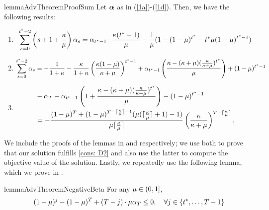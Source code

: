     \begin{restatable}{lemma}{AdvTheoremProofSum}
    \label{lemma: AdvTheoremProofSum}
        Let $\bm{\alpha}$ as in (\ref{1a})-(\ref{1d}). Then, we have the following results:
        \begin{enumerate}
            \item \begin{equation*}
            \sum_{s=0}^{t^*-2} \left(s+1+\frac{\kappa}{\mu} \right) \alpha_s= \alpha_{t^*-1} \cdot \frac{\kappa(t^*-1)}{\mu} - \frac{1}{\mu} (1 - (1-\mu)^{t^*} - t^* \mu (1-\mu)^{t^*-1})
        \end{equation*}
        \item \begin{equation*}
            \sum_{s=0}^{t^*-2} \alpha_s = -\frac{1}{1 + \kappa} - \frac{\kappa}{1 + \kappa} \left( \frac{\kappa(1-\mu)}{\kappa +\mu} \right)^{t^* - 1} +  \alpha_{t^*-1} \left( \frac{\kappa - (\kappa + \mu)(\frac{\kappa}{\kappa + \mu})^{t^*}}{\mu} \right) + (1-\mu)^{t^*-1}
        \end{equation*}
        \item \begin{align*}
        & -  \alpha_T - \alpha_{t^*-1} \left( 1 + \frac{\kappa - (\kappa + \mu)(\frac{\kappa}{\kappa + \mu})^{t^*}}{\mu} \right) - (1-\mu)^{t^*-1}\\
        &= - \frac{(1-\mu)^T + (1-\mu)^{T - \lceil \frac{\kappa}{\mu}\rceil - 1} (\mu ( \lceil \frac{\kappa}{\mu} \rceil+1) -1)}{ \mu \lceil \frac{\kappa}{\mu}\rceil} \left(\frac{\kappa}{\kappa + \mu} \right)^{T - \lceil \frac{\kappa}{\mu}\rceil}.
    \end{align*}
\end{enumerate}
    \end{restatable}
We include the proofs of the lemmas in  and  respectively; we use both to prove that our solution fulfills \ref{cons: D2} and also use the latter to compute the objective value of the solution. Lastly, we repeatedly use the following lemma, which we prove in .
    
    \begin{restatable}{lemma}{AdvTheoremNegativeBeta}
        \label{lemma: AdvTheoremNegativeBeta}
        For any $\mu \in (0,1]$, 
        \begin{equation*}
            (1-\mu)^j - (1-\mu)^T + (T-j) \cdot \mu \alpha_T \leq 0, \quad \forall j \in \{t^*, \ldots, T-1\}
        \end{equation*}
\end{restatable}

